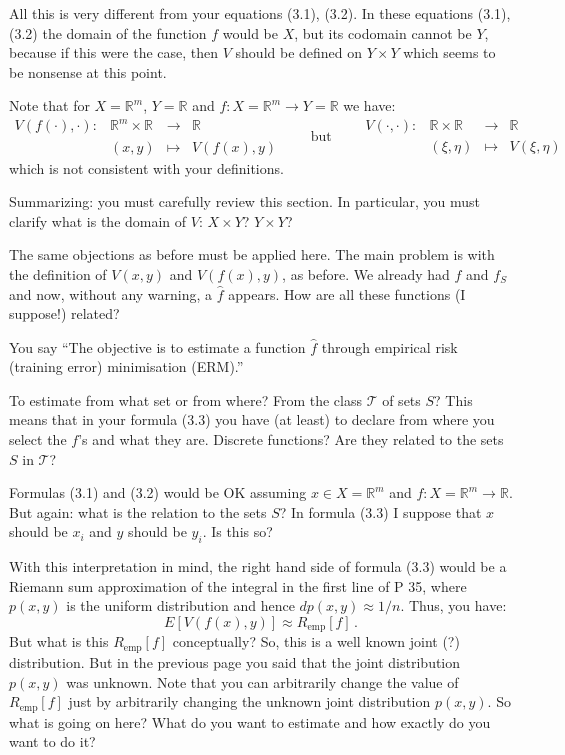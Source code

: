 \documentclass[12pt,reqno]{amsart}
\def\R{{\mathbb R }}
\def\red#1{{\color{red} #1}}
\begin{document}
\begin{description}[style=unboxed,leftmargin=0cm,itemsep=3ex]
All this is very different from \red{your} equations (3.1), (3.2).
In these equations (3.1), (3.2) the domain of the function $f$
would be $X$, but its codomain cannot be $Y$, because if this were the
case, then $V$ should be defined on $Y\times Y$ which seems to be nonsense
at this point.

Note that for $X=\R^m$, $Y=\R$ and $f:X=\R^m\longrightarrow Y=\R$
we have:
$$
\begin{array}{rccl}
V(f(\cdot),\cdot): & \R^m\times\R  & \longrightarrow & \R \\
   & (x,y) & \longmapsto     & V(f(x),y)
\end{array}
\qquad\text{but}\qquad
\begin{array}{rccl}
V(\cdot,\cdot): & \R\times\R  & \longrightarrow & \R     \\
    & (\xi,\eta) & \longmapsto     & V(\xi,\eta)
\end{array}
$$
which is not consistent with your definitions.

Summarizing: you must carefully review this section. In particular,
you must clarify what is the domain of $V$: $X\times Y$? $Y\times Y$?


The same objections as before must be applied here.
The main problem is with the definition of $V(x,y)$ and $V(f(x),y)$,
as before.
We already had $f$ and $f_S$ and now, without any warning, a $\widehat{f}$
appears.
How are all these functions (I suppose!) related?

You say ``The objective is to estimate a function $\widehat{f}$ through
empirical risk (training error) minimisation (ERM).''

To estimate from what set or from where?
From the class $\mathscr{T}$ of sets $S$?
This means that in your formula (3.3) you have (at least) to declare
from where you select the $f$'s and what they are. 
Discrete functions?
Are they related to the sets $S$ in $\mathscr{T}$?

Formulas (3.1) and (3.2) would be OK assuming $x\in X=\R^m$ and
$f:X=\R^m\to\R$.
But again: what is the relation to the sets $S$?
In formula (3.3) I suppose that $x$ should be $x_i$ and $y$ should be
$y_i$. Is this so?

With this interpretation in mind, the right hand side of formula (3.3)
would be a Riemann sum approximation of the integral in the first line
of P 35, \red{where $p(x,y)$ is the uniform distribution and hence
$dp(x,y) \approx 1/n$}.
Thus, you have:
$$
E[V(f(x),y)] \approx R_{\text{emp}}[f]\,.
$$
But what is this $R_{\text{emp}}[f]$ conceptually?
So, this is a well known joint (?) distribution.
But in the previous page you said that the joint distribution $p(x,y)$
was \red{unknown}.
Note that you can arbitrarily change the value of $R_{\text{emp}}[f]$ just
by arbitrarily changing the unknown joint distribution $p(x,y)$.
So what is going on here?
What do you want to estimate and how exactly do you want to do it?



\end{description}
\end{document}
